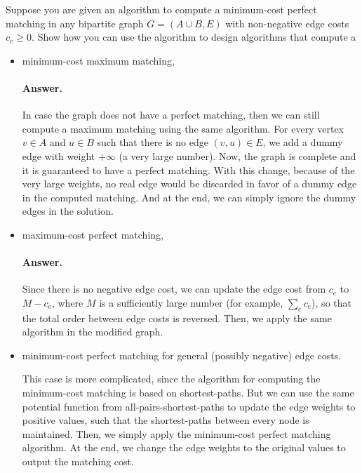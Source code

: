 \documentclass[a4paper]{article}
\begin{document}
Suppose you are given an algorithm to compute a minimum-cost perfect matching in any bipartite graph $G = (A \cup B, E)$ with non-negative edge costs $c_e \ge 0$. Show how you can use the algorithm to design algorithms that compute a
\begin{itemize}
\item minimum-cost maximum matching,

\paragraph{Answer.}

In case the graph does not have a perfect matching, then we can still compute a maximum matching using the same algorithm. For every vertex $v \in A$ and $u \in B$ such that there is no edge $(v,u) \in E$, we add a dummy edge with weight $+ \infty$ (a very large number). Now, the graph is complete and it is guaranteed to have a perfect matching.
With this change, because of the very large weights, no real edge would be discarded in favor of a dummy edge in the computed matching. And at the end, we can simply ignore the dummy edges in the solution.

\item maximum-cost perfect matching,

\paragraph{Answer.}

Since there is no negative edge cost, we can update the edge cost from $c_e$ to $M - c_e$, where $M$ is a sufficiently large number (for example, $\sum_e c_e$), so that the total order between edge costs is reversed. Then, we apply the same algorithm in the modified graph.

\item minimum-cost perfect matching for general (possibly negative) edge costs.

This case is more complicated, since the algorithm for computing the minimum-cost matching is based on shortest-paths.
But we can use the same potential function from all-pairs-shortest-paths to update the edge weights to positive values, such that the shortest-paths between every node is maintained. Then, we simply apply the minimum-cost perfect matching algorithm.
At the end, we change the edge weights to the original values to output the matching cost.

\end{itemize}
\end{document}
